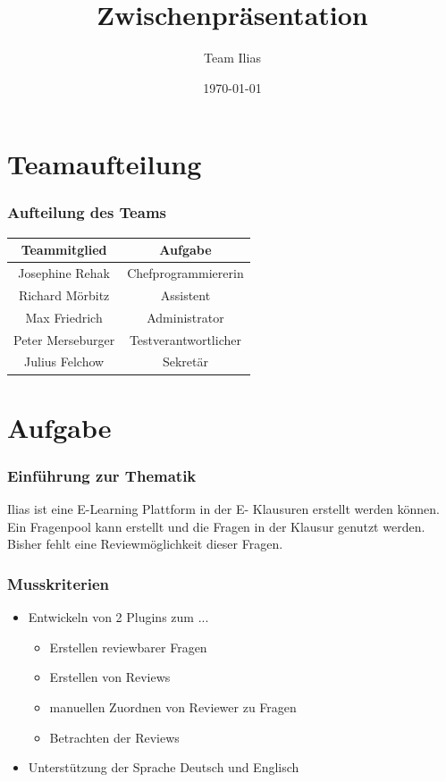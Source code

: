 \documentclass{beamer}
\title{Zwischenpräsentation}
\author{Team Ilias}
\date{\today}
\begin{document}
	\maketitle
	\frame{\tableofcontents[]}

	\section{Teamaufteilung}
	\begin{frame}
		\frametitle{Aufteilung des Teams}
		\begin{tabular}{|c|c|}\hline
			Teammitglied & Aufgabe \\\hline
			Josephine Rehak & Chefprogrammiererin\\\hline
			Richard Mörbitz & Assistent\\\hline
			Max Friedrich & Administrator\\\hline
			Peter Merseburger & Testverantwortlicher\\\hline
			Julius Felchow & Sekretär\\\hline
		\end{tabular}
	\end{frame} 
 
	\section{Aufgabe}
		\begin{frame} %
			\frametitle{Einführung zur Thematik} %
  			Ilias ist eine E-Learning Plattform in der E-					Klausuren erstellt werden können. Ein Fragenpool 				kann erstellt und die Fragen in der Klausur 					genutzt werden.\\
    		Bisher fehlt eine Reviewmöglichkeit dieser Fragen.
		\end{frame}

		\begin{frame} %
			\frametitle{Musskriterien} %
	    	\begin{itemize}
	    		\item Entwickeln von 2 Plugins zum ... 
	    			\begin{itemize}
	    				\item Erstellen reviewbarer Fragen
	    				\item Erstellen von Reviews
    					\item manuellen Zuordnen von Reviewer 							zu Fragen
    					\item Betrachten der Reviews
					\end{itemize}    			
    			\item Unterstützung der Sprache Deutsch und 					Englisch
    		\end{itemize}
		\end{frame}
\end{document}
